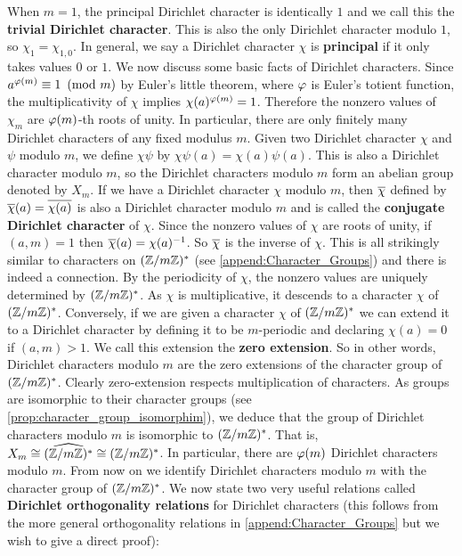     When $m = 1$, the principal Dirichlet character is identically $1$ and we call this the \textbf{trivial Dirichlet character}. This is also the only Dirichlet character modulo $1$, so $\chi_{1} = \chi_{1,0}$. In general, we say a Dirichlet character $\chi$ is \textbf{principal} if it only takes values $0$ or $1$. We now discuss some basic facts of Dirichlet characters. Since $a^{\varphi(m)} \equiv 1 \ \left(\text{mod }m\right)$ by Euler's little theorem, where $\varphi$ is Euler's totient function, the multiplicativity of $\chi$ implies $\chi(a)^{\varphi(m)} = 1$. Therefore the nonzero values of $\chi_{m}$ are $\varphi(m)$-th roots of unity. In particular, there are only finitely many Dirichlet characters of any fixed modulus $m$. Given two Dirichlet character $\chi$ and $\psi$ modulo $m$, we define $\chi\psi$ by $\chi\psi(a) = \chi(a)\psi(a)$. This is also a Dirichlet character modulo $m$, so the Dirichlet characters modulo $m$ form an abelian group denoted by $X_{m}$. If we have a Dirichlet character $\chi$ modulo $m$, then $\overline{\chi}$ defined by $\overline{\chi}(a) = \overline{\chi(a)}$ is also a Dirichlet character modulo $m$ and is called the \textbf{conjugate Dirichlet character} of $\chi$. Since the nonzero values of $\chi$ are roots of unity, if $(a,m) = 1$ then $\overline{\chi}(a) = \chi(a)^{-1}$. So $\overline{\chi}$ is the inverse of $\chi$. This is all strikingly similar to characters on $(\mathbb{Z}/m\mathbb{Z})^{\ast}$ (see \cref{append:Character_Groups}) and there is indeed a connection. By the periodicity of $\chi$, the nonzero values are uniquely determined by $(\mathbb{Z}/m\mathbb{Z})^{\ast}$. As $\chi$ is multiplicative, it descends to a character $\chi$ of $(\mathbb{Z}/m\mathbb{Z})^{\ast}$. Conversely, if we are given a character $\chi$ of $(\mathbb{Z}/m\mathbb{Z})^{\ast}$ we can extend it to a Dirichlet character by defining it to be $m$-periodic and declaring $\chi(a) = 0$ if $(a,m) > 1$. We call this extension the \textbf{zero extension}. So in other words, Dirichlet characters modulo $m$ are the zero extensions of the character group of $(\mathbb{Z}/m\mathbb{Z})^{\ast}$. Clearly zero-extension respects multiplication of characters. As groups are isomorphic to their character groups (see \cref{prop:character_group_isomorphim}), we deduce that the group of Dirichlet characters modulo $m$ is isomorphic to $(\mathbb{Z}/m\mathbb{Z})^{\ast}$. That is, $X_{m} \cong \widehat{(\mathbb{Z}/m\mathbb{Z})^{\ast}} \cong (\mathbb{Z}/m\mathbb{Z})^{\ast}$. In particular, there are $\varphi(m)$ Dirichlet characters modulo $m$. From now on we identify Dirichlet characters modulo $m$ with the character group of $(\mathbb{Z}/m\mathbb{Z})^{\ast}$. We now state two very useful relations called \textbf{Dirichlet orthogonality relations} for Dirichlet characters (this follows from the more general orthogonality relations in \cref{append:Character_Groups} but we wish to give a direct proof):

